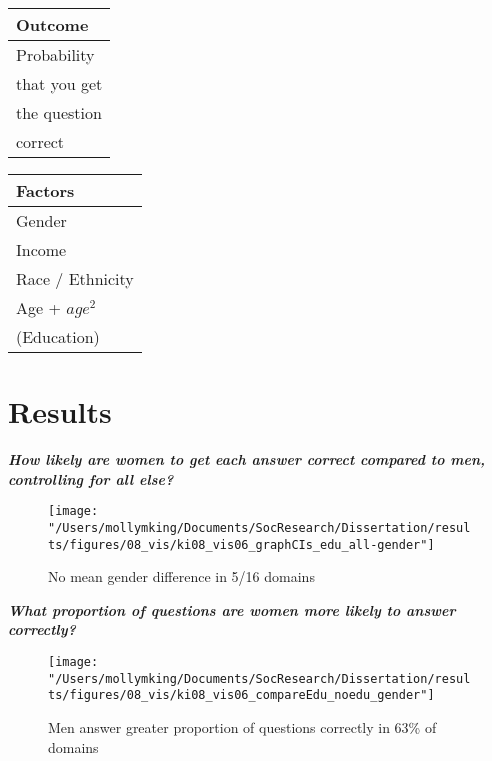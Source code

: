 \documentclass[]{article}
\begin{document}
\begin{table}[ht]
\centering
     \begin{tabular}{l}  %
       \hline   %
       Outcome        \\
       \hline   %
       Probability      \\
       that you get     \\
       the question     \\
       correct          \\
       \hline  %
     \end{tabular}
     \begin{tabular}{l}  %
       \hline   %
       Factors          \\
       \hline   %
       Gender           \\
       Income           \\
       Race / Ethnicity \\
       Age + $age^2$    \\
       (Education)        \\
       \hline  %
      \end{tabular}
\end{table}


\newpage
\section{Results}\label{Results}

\emph{\textbf{How likely are women to get each answer correct compared to men, controlling for all else?}}
\begin{figure}[ht]
    \begin{center}
      \texttt{[image: "/Users/mollymking/Documents/SocResearch/Dissertation/results/figures/08\_vis/ki08\_vis06\_graphCIs\_edu\_all-gender"]}
      \caption{No mean gender difference in 5/16 domains}
    \end{center}
\end{figure}

\emph{\textbf{What proportion of questions are women more likely to answer correctly?}}
\begin{figure}[ht]
    \begin{center}
      \texttt{[image: "/Users/mollymking/Documents/SocResearch/Dissertation/results/figures/08\_vis/ki08\_vis06\_compareEdu\_noedu\_gender"]}
      \caption{Men answer greater proportion of questions correctly in 63\% of domains}
    \end{center}
\end{figure}
\end{document}
